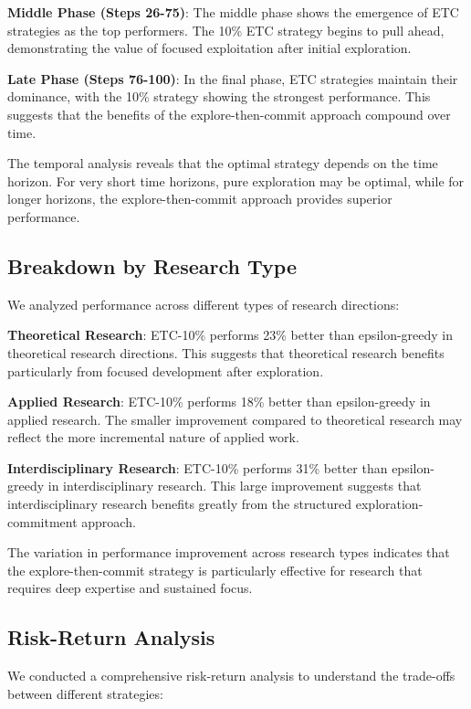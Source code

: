 \documentclass[letterpaper]{article} %
\begin{document}
\textbf{Middle Phase (Steps 26-75)}: The middle phase shows the emergence of ETC strategies as the top performers. The 10\% ETC strategy begins to pull ahead, demonstrating the value of focused exploitation after initial exploration.

\textbf{Late Phase (Steps 76-100)}: In the final phase, ETC strategies maintain their dominance, with the 10\% strategy showing the strongest performance. This suggests that the benefits of the explore-then-commit approach compound over time.

The temporal analysis reveals that the optimal strategy depends on the time horizon. For very short time horizons, pure exploration may be optimal, while for longer horizons, the explore-then-commit approach provides superior performance.

\subsection{Breakdown by Research Type}

We analyzed performance across different types of research directions:

\textbf{Theoretical Research}: ETC-10\% performs 23\% better than epsilon-greedy in theoretical research directions. This suggests that theoretical research benefits particularly from focused development after exploration.

\textbf{Applied Research}: ETC-10\% performs 18\% better than epsilon-greedy in applied research. The smaller improvement compared to theoretical research may reflect the more incremental nature of applied work.

\textbf{Interdisciplinary Research}: ETC-10\% performs 31\% better than epsilon-greedy in interdisciplinary research. This large improvement suggests that interdisciplinary research benefits greatly from the structured exploration-commitment approach.

The variation in performance improvement across research types indicates that the explore-then-commit strategy is particularly effective for research that requires deep expertise and sustained focus.

\subsection{Risk-Return Analysis}

We conducted a comprehensive risk-return analysis to understand the trade-offs between different strategies:
\end{document}
